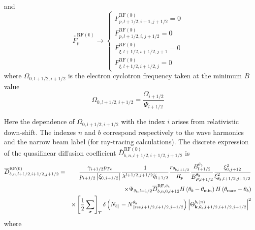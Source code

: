 and
\begin{equation}
\overline{\overline{F}}_{p}^{\text{RF}\left( 0\right) }\rightarrow \left\{
\begin{array}{l}
F_{p,l+1/2,i+1,j+1/2}^{\text{RF}\left( 0\right) }=0 \\
F_{p,l+1/2,i,j+1/2}^{\text{RF}\left( 0\right) }=0 \\
F_{\xi ,l+1/2,i+1/2,j+1}^{\text{RF}\left( 0\right) }=0 \\
F_{\xi ,l+1/2,i+1/2,j}^{\text{RF}\left( 0\right) }=0
\end{array}
\right.
\end{equation}
where $\Omega _{0,l+1/2,i+1/2}$ is the electron cyclotron frequency taken at
the minimum $B$ value
\begin{equation}
\Omega _{0,l+1/2,i+1/2}=\frac{\Omega _{i+1/2}}{\Psi _{l+1/2}}
\end{equation}

Here the dependence of $\Omega _{0,l+1/2,i+1/2}$ with the index $i$ arises
from relativistic down-shift. The indexes $n$ and $b$ correspond
respectively to the wave harmonics and the narrow beam label (for
ray-tracing calculations). The discrete expression of the quasilinear
diffusion coefficient $\overline{D}_{b,n,l+1/2,i+1/2,j+1/2}^{\text{RF}(0)}$
is
\begin{eqnarray}
\overline{D}_{b,n,l+1/2,i+1/2,j+1/2}^{\text{RF}(0)} &=&\frac{\gamma
_{i+1/2}p_{Te}}{p_{i+1/2}\left| \xi _{0,j+1/2}\right| }\frac{1}{\lambda
^{l+1/2,j+1/2}\widetilde{q}_{l+1/2}}\frac{r_{\theta _{b,l+1/2}}}{R_{p}}\frac{%
B_{l+1/2}^{\theta _{b}}}{B_{P,l+1/2}^{\theta _{b}}}\frac{\xi _{0,j+12}^{2}}{%
\xi _{\theta _{b},l+1/2,j+1/2}^{2}}  \nonumber \\
&&\times \Psi _{\theta _{b},l+1/2}\overline{D}_{b,n,0,l+12}^{\text{RF,}%
\theta _{b}}H\left( \theta _{b}-\theta _{\min }\right) H\left( \theta _{\max
}-\theta _{b}\right)   \nonumber \\
&&\times \left[ \frac{1}{2}\sum\limits_{\sigma }\right] _{T}\delta \left(
N_{b\Vert }-N_{\Vert \text{res,}l+1/2,i+1/2,j+1/2}^{\theta _{b}}\right)
\left| \Theta _{\mathbf{k,}\theta _{b}\text{,}l+1/2,i+1/2,j+1/2}^{b,\left(
n\right) }\right| ^{2}\nonumber \\
\end{eqnarray}
where

